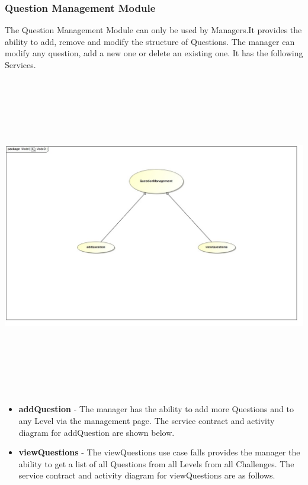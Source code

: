 \documentclass[english]{article}
\begin{document}
		\subsubsection{Question Management Module}
		The Question Management Module can only be used by Managers.It provides the ability to add, remove and modify the structure of Questions. The manager can modify any question, add a new one or delete an existing one. It has the following Services.
		
				\includegraphics[width=14cm,height=14cm,keepaspectratio]{questionManagement.jpg}
		
		
		\begin{itemize}
	  		\item \textbf{addQuestion} -  The manager has the ability to add more Questions and to any Level via the management page. The service contract and activity diagram for addQuestion are shown below.
	  		
			\item \textbf{viewQuestions} - The viewQuestions use case falls provides the manager the ability to get a list of all Questions from all Levels from all Challenges. The service contract and activity diagram for viewQuestions are as follows.
			
	
		\end{itemize}
		
\end{document}
